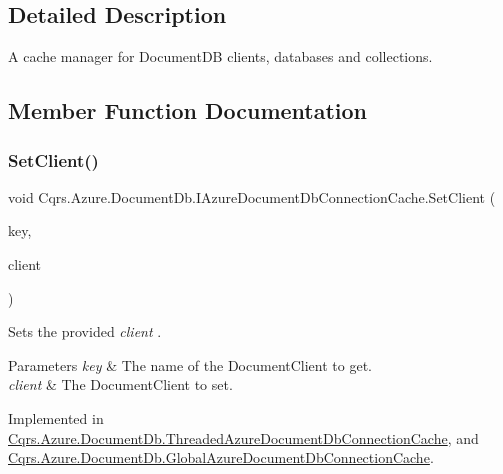 \subsection{Detailed Description}
A cache manager for Document\+DB clients, databases and collections. 



\subsection{Member Function Documentation}
\mbox{\label{interfaceCqrs_1_1Azure_1_1DocumentDb_1_1IAzureDocumentDbConnectionCache_a38d813e12b632a93a2934e2b1252f409_a38d813e12b632a93a2934e2b1252f409}} 
\subsubsection{\texorpdfstring{Set\+Client()}{SetClient()}}
{\footnotesize\ttfamily void Cqrs.\+Azure.\+Document\+Db.\+I\+Azure\+Document\+Db\+Connection\+Cache.\+Set\+Client (\begin{DoxyParamCaption}\item[{string}]{key,  }\item[{Document\+Client}]{client }\end{DoxyParamCaption})}



Sets the provided {\itshape client} . 


\begin{DoxyParams}{Parameters}
{\em key} & The name of the Document\+Client to get.\\
\hline
{\em client} & The Document\+Client to set.\\
\hline
\end{DoxyParams}


Implemented in \hyperlink{classCqrs_1_1Azure_1_1DocumentDb_1_1ThreadedAzureDocumentDbConnectionCache_a4fbbe06abc4c5664243b7be029a4031f_a4fbbe06abc4c5664243b7be029a4031f}{Cqrs.\+Azure.\+Document\+Db.\+Threaded\+Azure\+Document\+Db\+Connection\+Cache}, and \hyperlink{classCqrs_1_1Azure_1_1DocumentDb_1_1GlobalAzureDocumentDbConnectionCache_a4fbca6dadf7b2d1ffa753d755982820b_a4fbca6dadf7b2d1ffa753d755982820b}{Cqrs.\+Azure.\+Document\+Db.\+Global\+Azure\+Document\+Db\+Connection\+Cache}.

